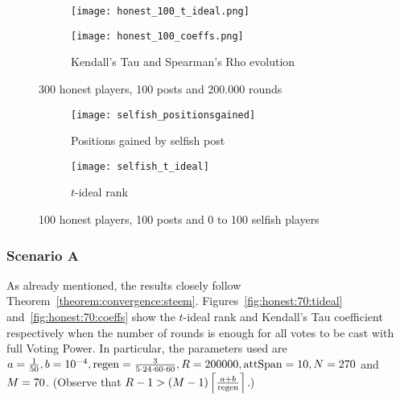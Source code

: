     \begin{figure}[h]
      \begin{subfigure}[t]{0.5\textwidth}
        \centering
        \texttt{[image: honest\_100\_t\_ideal.png]}
        \label{fig:honest:100:tideal}
      \end{subfigure}\hfill
      \begin{subfigure}[t]{0.5\textwidth}
        \centering
        \texttt{[image: honest\_100\_coeffs.png]}
        \caption{Kendall's Tau and Spearman's Rho evolution}
        \label{fig:honest:100:coeffs}
      \end{subfigure}
      \caption{300 honest players, 100 posts and 200.000 rounds}
    \end{figure}

    \begin{figure}[h]
      \begin{subfigure}[t]{0.5\textwidth}
        \centering
        \texttt{[image: selfish\_positionsgained]}
        \caption{Positions gained by selfish post}
        \label{fig:selfish:gain}
      \end{subfigure}\hfill
      \begin{subfigure}[t]{0.5\textwidth}
        \centering
        \texttt{[image: selfish\_t\_ideal]}
        \caption{$t$-ideal rank}
        \label{fig:selfish:tideal}
      \end{subfigure}
      \caption{100 honest players, 100 posts and 0 to 100 selfish players}
    \end{figure}

    \subsubsection{Scenario A}
      As already mentioned, the results closely follow
      Theorem~\ref{theorem:convergence:steem}.
      Figures~\ref{fig:honest:70:tideal} and~\ref{fig:honest:70:coeffs} show the
      $t$-ideal rank and Kendall's Tau coefficient respectively when the number
      of rounds is enough for all votes to be cast with full Voting Power. In
      particular, the parameters used are $a = \frac{1}{50}, b = 10^{-4}, \regen
      = \frac{3}{5 \cdot 24 \cdot 60 \cdot 60}, \rounds = 200000, \attspan = 10,
      \playerlen = 270$ and $\postlen = 70$. (Observe that $\rounds - 1 >
      \left(\postlen - 1\right)\ceil*{\frac{a + b}{\regen}}$.)

